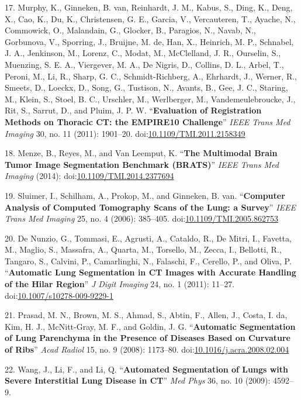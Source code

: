 \documentclass[11pt,]{article}
\begin{document}
17. Murphy, K., Ginneken, B. van, Reinhardt, J. M., Kabus, S., Ding, K.,
Deng, X., Cao, K., Du, K., Christensen, G. E., Garcia, V., Vercauteren,
T., Ayache, N., Commowick, O., Malandain, G., Glocker, B., Paragios, N.,
Navab, N., Gorbunova, V., Sporring, J., Bruijne, M. de, Han, X.,
Heinrich, M. P., Schnabel, J. A., Jenkinson, M., Lorenz, C., Modat, M.,
McClelland, J. R., Ourselin, S., Muenzing, S. E. A., Viergever, M. A.,
De Nigris, D., Collins, D. L., Arbel, T., Peroni, M., Li, R., Sharp, G.
C., Schmidt-Richberg, A., Ehrhardt, J., Werner, R., Smeets, D., Loeckx,
D., Song, G., Tustison, N., Avants, B., Gee, J. C., Staring, M., Klein,
S., Stoel, B. C., Urschler, M., Werlberger, M., Vandemeulebroucke, J.,
Rit, S., Sarrut, D., and Pluim, J. P. W. ``\textbf{Evaluation of
Registration Methods on Thoracic CT: the EMPIRE10 Challenge}''
\emph{IEEE Trans Med Imaging} 30, no. 11 (2011): 1901--20.
doi:\href{http://dx.doi.org/10.1109/TMI.2011.2158349}{10.1109/TMI.2011.2158349}

18. Menze, B., Reyes, M., and Van Leemput, K. ``\textbf{The Multimodal
Brain Tumor Image Segmentation Benchmark (BRATS)}'' \emph{IEEE Trans Med
Imaging} (2014):
doi:\href{http://dx.doi.org/10.1109/TMI.2014.2377694}{10.1109/TMI.2014.2377694}

19. Sluimer, I., Schilham, A., Prokop, M., and Ginneken, B. van.
``\textbf{Computer Analysis of Computed Tomography Scans of the Lung: a
Survey}'' \emph{IEEE Trans Med Imaging} 25, no. 4 (2006): 385--405.
doi:\href{http://dx.doi.org/10.1109/TMI.2005.862753}{10.1109/TMI.2005.862753}

20. De Nunzio, G., Tommasi, E., Agrusti, A., Cataldo, R., De Mitri, I.,
Favetta, M., Maglio, S., Massafra, A., Quarta, M., Torsello, M., Zecca,
I., Bellotti, R., Tangaro, S., Calvini, P., Camarlinghi, N., Falaschi,
F., Cerello, P., and Oliva, P. ``\textbf{Automatic Lung Segmentation in
CT Images with Accurate Handling of the Hilar Region}'' \emph{J Digit
Imaging} 24, no. 1 (2011): 11--27.
doi:\href{http://dx.doi.org/10.1007/s10278-009-9229-1}{10.1007/s10278-009-9229-1}

21. Prasad, M. N., Brown, M. S., Ahmad, S., Abtin, F., Allen, J., Costa,
I. da, Kim, H. J., McNitt-Gray, M. F., and Goldin, J. G.
``\textbf{Automatic Segmentation of Lung Parenchyma in the Presence of
Diseases Based on Curvature of Ribs}'' \emph{Acad Radiol} 15, no. 9
(2008): 1173--80.
doi:\href{http://dx.doi.org/10.1016/j.acra.2008.02.004}{10.1016/j.acra.2008.02.004}

22. Wang, J., Li, F., and Li, Q. ``\textbf{Automated Segmentation of
Lungs with Severe Interstitial Lung Disease in CT}'' \emph{Med Phys} 36,
no. 10 (2009): 4592--9.
\end{document}
